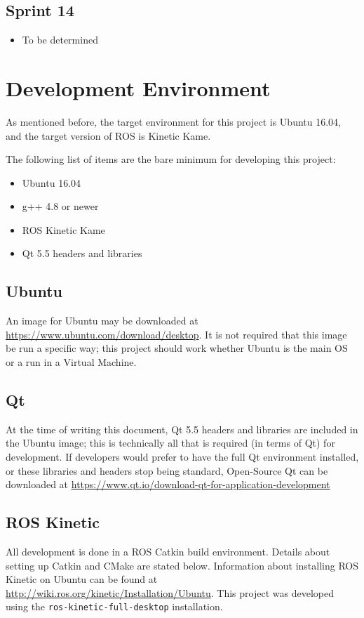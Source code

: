 \subsection{Sprint 14}
\begin{itemize}
	\item To be determined
\end{itemize}

\section{Development Environment}
As mentioned before, the target environment for this project is Ubuntu 16.04, and the target version of ROS is Kinetic Kame.

The following list of items are the bare minimum for developing this project:
\begin{itemize}
	\item Ubuntu 16.04
	\item g++ 4.8 or newer
	\item ROS Kinetic Kame
	\item Qt 5.5 headers and libraries
\end{itemize}

\subsection{Ubuntu}
An image for Ubuntu may be downloaded at \url{https://www.ubuntu.com/download/desktop}. It is not required that this image be run a specific way; this project should work whether Ubuntu is the main OS or a run in a Virtual Machine.

\subsection{Qt}
At the time of writing this document, Qt 5.5 headers and libraries are included in the Ubuntu image; this is technically all that is required (in terms of Qt) for development. If developers would prefer to have the full Qt environment installed, or these libraries and headers stop being standard, Open-Source Qt can be downloaded at \url{https://www.qt.io/download-qt-for-application-development}

\subsection{ROS Kinetic}
All development is done in a ROS Catkin build environment. Details about setting up Catkin and CMake are stated below. Information about installing ROS Kinetic on Ubuntu can be found at \url{http://wiki.ros.org/kinetic/Installation/Ubuntu}. This project was developed using the \lstinline|ros-kinetic-full-desktop| installation.


